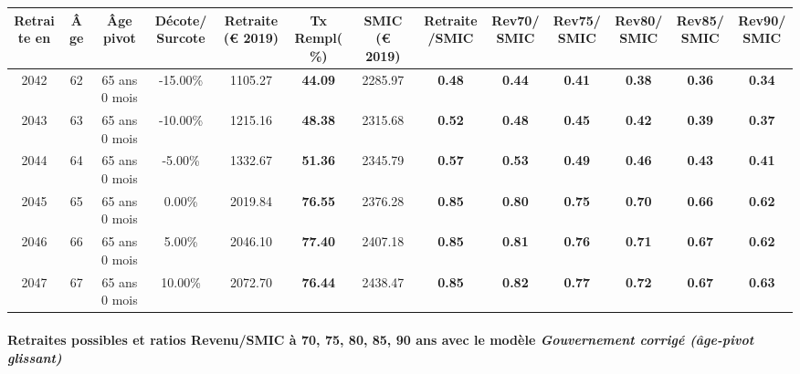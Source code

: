 { \scriptsize \begin{center} 
\begin{tabular}[htb]{|c|c||c|c||c|c||c||c|c|c|c|c|c|} 
\hline 
 Retraite en &  Âge &  Âge pivot &  Décote/Surcote &  Retraite (\euro{} 2019) &  Tx Rempl(\%) &  SMIC (\euro{} 2019) &  Retraite/SMIC &  Rev70/SMIC &  Rev75/SMIC &  Rev80/SMIC &  Rev85/SMIC &  Rev90/SMIC \\ 
\hline \hline 
 2042 &  62 &  65 ans 0 mois &  -15.00\% &  1105.27 &  {\bf 44.09} &  2285.97 &  {\bf {\color{red} 0.48}} &  {\bf {\color{red} 0.44}} &  {\bf {\color{red} 0.41}} &  {\bf {\color{red} 0.38}} &  {\bf {\color{red} 0.36}} &  {\bf {\color{red} 0.34}} \\ 
\hline 
 2043 &  63 &  65 ans 0 mois &  -10.00\% &  1215.16 &  {\bf 48.38} &  2315.68 &  {\bf {\color{red} 0.52}} &  {\bf {\color{red} 0.48}} &  {\bf {\color{red} 0.45}} &  {\bf {\color{red} 0.42}} &  {\bf {\color{red} 0.39}} &  {\bf {\color{red} 0.37}} \\ 
\hline 
 2044 &  64 &  65 ans 0 mois &  -5.00\% &  1332.67 &  {\bf 51.36} &  2345.79 &  {\bf {\color{red} 0.57}} &  {\bf {\color{red} 0.53}} &  {\bf {\color{red} 0.49}} &  {\bf {\color{red} 0.46}} &  {\bf {\color{red} 0.43}} &  {\bf {\color{red} 0.41}} \\ 
\hline 
 2045 &  65 &  65 ans 0 mois &  0.00\% &  2019.84 &  {\bf 76.55} &  2376.28 &  {\bf {\color{red} 0.85}} &  {\bf {\color{red} 0.80}} &  {\bf {\color{red} 0.75}} &  {\bf {\color{red} 0.70}} &  {\bf {\color{red} 0.66}} &  {\bf {\color{red} 0.62}} \\ 
\hline 
 2046 &  66 &  65 ans 0 mois &  5.00\% &  2046.10 &  {\bf 77.40} &  2407.18 &  {\bf {\color{red} 0.85}} &  {\bf {\color{red} 0.81}} &  {\bf {\color{red} 0.76}} &  {\bf {\color{red} 0.71}} &  {\bf {\color{red} 0.67}} &  {\bf {\color{red} 0.62}} \\ 
\hline 
 2047 &  67 &  65 ans 0 mois &  10.00\% &  2072.70 &  {\bf 76.44} &  2438.47 &  {\bf {\color{red} 0.85}} &  {\bf {\color{red} 0.82}} &  {\bf {\color{red} 0.77}} &  {\bf {\color{red} 0.72}} &  {\bf {\color{red} 0.67}} &  {\bf {\color{red} 0.63}} \\ 
\hline 
\hline 
\end{tabular} 
\end{center} } 
\paragraph{Retraites possibles et ratios Revenu/SMIC à 70, 75, 80, 85, 90 ans avec le modèle \emph{Gouvernement corrigé (âge-pivot glissant)}}  
 
